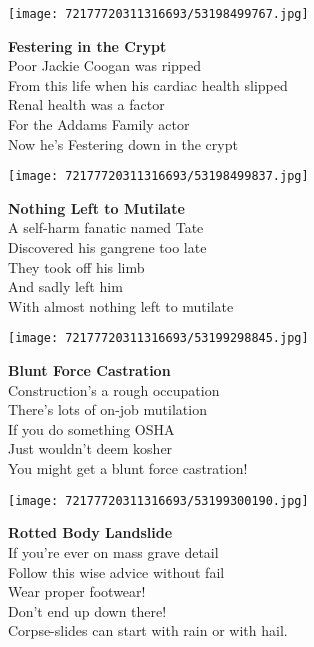 \documentclass[10pt,letterpaper]{article}
\begin{document}
\begin{center}
\texttt{[image: 72177720311316693/53198499767.jpg]}
\end{center}
\textbf{Festering in the Crypt}\\
\vskip 0.2in
Poor Jackie Coogan was ripped\\
From this life when his cardiac health slipped\\
Renal health was a factor\\
For the Addams Family actor\\
Now he's Festering down in the crypt\\
\begin{center}

\end{center}
\pagebreak

\begin{center}\texttt{[image: 72177720311316693/53198499837.jpg]}
\end{center}
\begin{center}
\textbf{Nothing Left to Mutilate}\\
\vskip 0.2in
A self-harm fanatic named Tate\\
Discovered his gangrene too late\\
They took off his limb\\
And sadly left him\\
With almost nothing left to mutilate\\
\end{center}
\pagebreak

\begin{center}
\texttt{[image: 72177720311316693/53199298845.jpg]}
\end{center}

\begin{center}
\textbf{Blunt Force Castration}\\
\vskip 0.2in
Construction's a rough occupation\\
There's lots of on-job mutilation\\
If you do something OSHA\\
Just wouldn't deem kosher\\
You might get a blunt force castration!\\
\end{center}
\pagebreak

\begin{center}\texttt{[image: 72177720311316693/53199300190.jpg]}
\end{center}
\begin{center}
\textbf{Rotted Body Landslide}\\
\vskip 0.2in
If you're ever on mass grave detail\\
Follow this wise advice without fail\\
Wear proper footwear!\\
Don't end up down there!\\
Corpse-slides can start with rain or with hail.\\
\end{center}
\pagebreak
\end{document}
